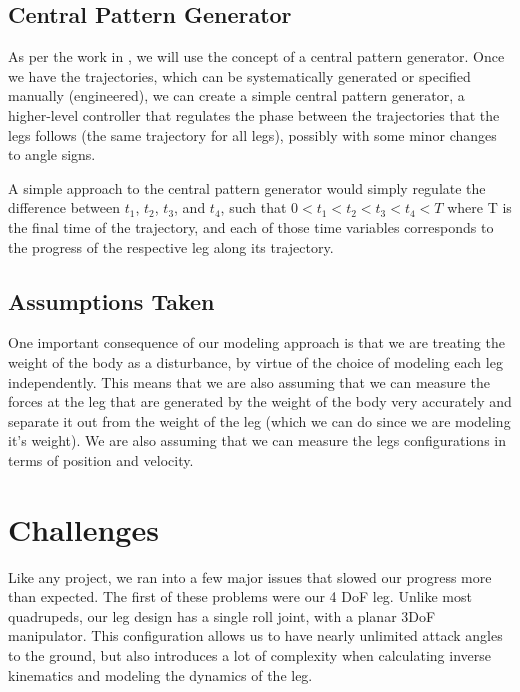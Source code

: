 \subsection{Central Pattern Generator}
As per the work in \cite{kimura2007adaptive}, we will use the concept of a central pattern generator. Once we have the trajectories, which can be systematically generated or specified manually (engineered), we can create a simple central pattern generator, a higher-level controller that regulates the phase between the trajectories that the legs follows (the same trajectory for all legs), possibly with some minor changes to angle signs.

A simple approach to the central pattern generator would simply regulate the difference between $t_1$, $t_2$, $t_3$, and $t_4$, such that $0 < t_1 < t_2 < t_3 < t_4 < T$ where T is the final time of the trajectory, and each of those time variables corresponds to the progress of the respective leg along its trajectory.

\subsection{Assumptions Taken}
One important consequence of our modeling approach is that we are treating the weight of the body as a disturbance, by virtue of the choice of modeling each leg independently. This means that we are also assuming that we can measure the forces at the leg that are generated by the weight of the body very accurately and separate it out from the weight of the leg (which we can do since we are modeling it's weight).
We are also assuming that we can measure the legs configurations in terms of position and velocity.


\section{Challenges}
Like any project, we ran into a few major issues that slowed our progress more than expected. The first of these problems were our 4 DoF leg. Unlike most quadrupeds, our leg design has a single roll joint, with a planar 3DoF manipulator. This configuration allows us to have nearly unlimited attack angles to the ground, but also introduces a lot of complexity when calculating inverse kinematics and modeling the dynamics of the leg.

